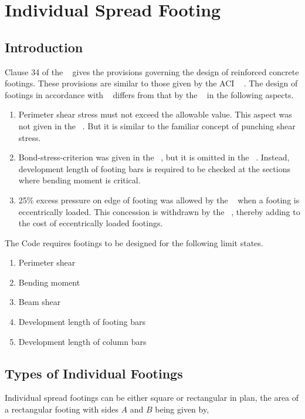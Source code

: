 \chapter{Individual Spread Footing}
\section{Introduction} Clause 34 of the ~ gives the provisions
governing the design of reinforced concrete footings.  These provisions are
similar to those given by the ACI ~ . The design of footings in
accordance with ~ differs from that by
the ~ in the following aspects.
\begin{enumerate}

\item Perimeter shear stress must not exceed the allowable value. This
aspect was not given in the ~. But it is similar to the familiar
concept of punching shear stress.

\item Bond-stress-criterion was given in the ~, but it is omitted in
the ~. Instead, development length of footing bars is required to be
checked at the sections where bending moment is critical.

\item 25\% excess pressure on edge of footing was allowed by the ~
when a footing is eccentrically loaded. This concession is withdrawn by
the  ~, thereby adding to the cost of eccentrically loaded footings.
\end{enumerate}
The Code requires footings to be designed for the following limit states.

\begin{enumerate}
\item Perimeter shear
\item Bending moment
\item Beam shear
\item Development length of footing bars
\item Development length of column bars
\end{enumerate}

\section{Types of Individual Footings} Individual spread footings can be either square or rectangular in plan, the area of a rectangular footing with sides $A$ and $B$ being given by,

